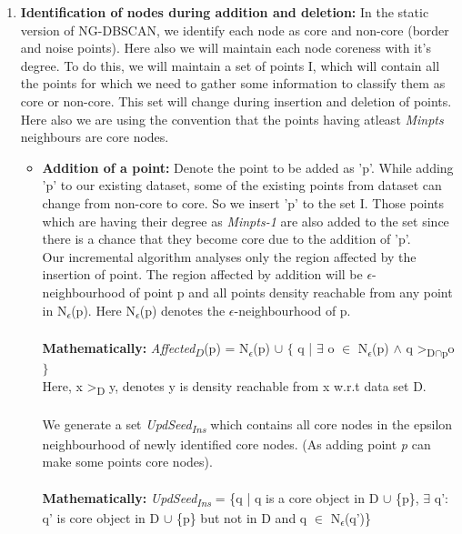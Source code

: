 \documentclass[acmsmall]{acmart}
\begin{document}
\begin{enumerate}
    \item \textbf{Identification of nodes during addition and deletion:} In the static version of NG-DBSCAN, we identify each node as core and non-core (border and noise points). Here also we will maintain each node coreness with it's degree. To do this, we will maintain a set of points I, which will contain all the points for which we need to gather some information to classify them as core or non-core. This set will change during insertion and deletion of points. Here also we are using the convention that the points having atleast \textit{Minpts} neighbours are core nodes. 
    \begin{itemize}
        \item \textbf{Addition of a point:} Denote the point to be added as 'p'. While adding 'p' to our existing dataset, some of the existing points from dataset can change from non-core to core. So we insert 'p' to the set I. Those points which are having their degree as \textit{Minpts-1} are also added to the set since there is a chance that they become core due to the addition of 'p'. \\
        Our incremental algorithm analyses only the region affected by the insertion of point. The region affected by addition will be $\epsilon$-neighbourhood of point p and all points density reachable from any point in N\textsubscript{$\epsilon$}(p). Here N\textsubscript{$\epsilon$}(p) denotes the $\epsilon$-neighbourhood of p. \\ \\ \textbf{Mathematically:} \textit{Affected}\textsubscript{$D$}(p) = N\textsubscript{$\epsilon$}(p) $\cup$ $\{$ q | $\exists$ o $\in$ N\textsubscript{$\epsilon$}(p) $\land$ q >\textsubscript{D$\cap$p}o $\}$ \\ Here, x >\textsubscript{D} y, denotes y is density reachable from x w.r.t data set D. \\ \\  
        We generate a set \textit{UpdSeed\textsubscript{Ins}} which contains all core nodes in the epsilon neighbourhood of newly identified core nodes. (As adding point \textit{p} can make some points core nodes).\\ \\ \textbf{Mathematically:} \textit{UpdSeed\textsubscript{Ins}} = \{q | q is a core object in D $\cup$ \{p\}, $\exists$ q’: q’ is core object in D $\cup$ \{p\} but not in D and q $\in$ N\textsubscript{$\epsilon$}(q')\} \\ \\

\end{itemize}
\end{enumerate}
\end{document}
